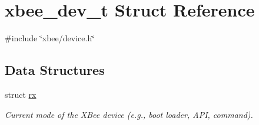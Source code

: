 \hypertarget{structxbee__dev__t}{}\section{xbee\+\_\+dev\+\_\+t Struct Reference}
\label{structxbee__dev__t}


{\ttfamily \#include \char`\"{}xbee/device.\+h\char`\"{}}

\subsection*{Data Structures}
\begin{DoxyCompactItemize}
\item 
struct \hyperlink{structxbee__dev__t_1_1rx}{rx}
\begin{DoxyCompactList}\small\item\em Current mode of the X\+Bee device (e.\+g., boot loader, A\+PI, command). \end{DoxyCompactList}\end{DoxyCompactItemize}
